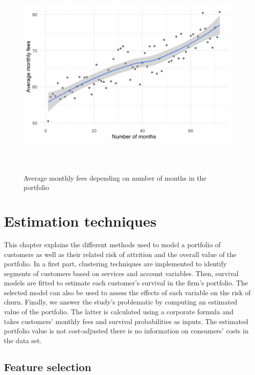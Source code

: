 \documentclass[
]{book}
\begin{document}
\begin{figure}

{\centering \includegraphics[width=450pt,height=300pt]{./imgs/monthly_charges_dur} 

}

\caption{Average monthly fees depending on number of months in the portfolio}\label{fig:monthlychargesdur}
\end{figure}

\hypertarget{estimation}{%
\chapter{Estimation techniques}\label{estimation}}

This chapter explains the different methods used to model a portfolio of customers as well as their related risk of attrition and the overall value of the portfolio. In a first part, clustering techniques are implemented to identify segments of customers based on services and account variables. Then, survival models are fitted to estimate each customer's survival in the firm's portfolio. The selected model can also be used to assess the effects of each variable on the risk of churn. Finally, we answer the study's problematic by computing an estimated value of the portfolio. The latter is calculated using a corporate formula and takes customers' monthly fees and survival probabilities as inputs. The estimated portfolio value is not cost-adjusted there is no information on consumers' costs in the data set.

\hypertarget{featureselection}{%
\section{Feature selection}\label{featureselection}}
\end{document}
